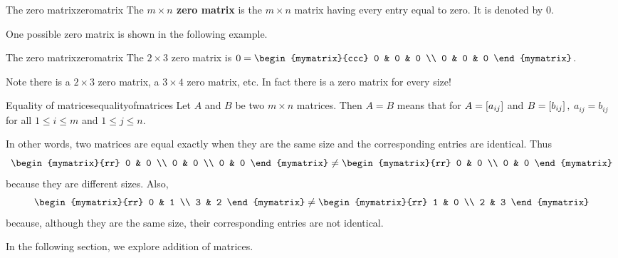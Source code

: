 \begin{definition}{The zero matrix}{zeromatrix}
The \textbf{$m\times n$ zero matrix} is the $m\times n$ matrix
having every entry equal to zero. It is denoted by $0.$
\end{definition}

One possible zero matrix is shown in the following example.

\begin{example}{The zero matrix}{zeromatrix}
The $2\times 3$ zero matrix is $0= \begin{mymatrix}{ccc}
0 & 0 & 0 \\
0 & 0 & 0
\end{mymatrix} $.
\end{example}

Note there is a $2\times 3$ zero matrix, a $3\times 4$ zero matrix, etc. In
fact there is a zero matrix for every size! 

\begin{definition}{Equality of matrices}{equalityofmatrices}
 Let $A$ and $B$ be two $m \times n$ matrices. Then $A=B$ means
that for $A=\left[ a_{ij}\right] $
and $B=\left[ b_{ij}\right] ,$ $a_{ij}=b_{ij}$ for all $1\leq i\leq m$ and 
$1\leq j\leq n.$
\end{definition}

In other words, two matrices are equal exactly when they are the same size and the
corresponding entries are identical. Thus
\begin{equation*}
\begin{mymatrix}{rr}
0 & 0 \\
0 & 0 \\
0 & 0
\end{mymatrix} \neq \begin{mymatrix}{rr}
0 & 0 \\
0 & 0
\end{mymatrix}
\end{equation*}
because they are different sizes. 
Also,
\begin{equation*}
\begin{mymatrix}{rr}
0 & 1 \\
3 & 2 
\end{mymatrix} \neq \begin{mymatrix}{rr}
1 & 0 \\
2 & 3
\end{mymatrix}
\end{equation*}
because, although they are the same size, their corresponding entries are not identical.

In the following section, we explore addition of matrices. 
